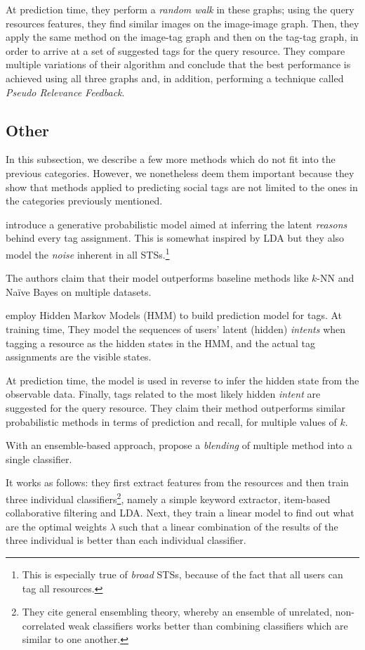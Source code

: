At prediction time, they perform a \textit{random walk} in these graphs; using the query resources features, they find similar images on the image-image graph. Then, they apply the same method on the image-tag graph and then on the tag-tag graph, in order to arrive at a set of suggested tags for the query resource. They compare multiple variations of their algorithm and conclude that the best performance is achieved using all three graphs and, in addition, performing a technique called \textit{Pseudo Relevance Feedback}.

\subsection{Other}

In this subsection, we describe a few more methods which do not fit into the previous categories. However, we nonetheless deem them important because they show that methods applied to predicting social tags are not limited to the ones in the categories previously mentioned. 

\cite{si_sun_2010} introduce a generative probabilistic model aimed at inferring the  latent \textit{reasons} behind every tag assignment. This is somewhat inspired by LDA but they also model the \textit{noise} inherent in all STSs.\footnote{This is especially true of \textit{broad} STSs, because of the fact that all users can tag all resources.}

The authors claim that their model outperforms baseline methods like $k$-NN and Naïve Bayes on multiple datasets.

\cite{trabelsi_etal_2012} employ Hidden Markov Models (HMM) \citep{rabiner_1989} to build prediction model for tags. At training time, They model the sequences of users' latent (hidden) \textit{intents} when tagging a resource as the hidden states in the HMM, and the actual tag assignments are the visible states.

At prediction time, the model is used in reverse to infer the hidden state from the observable data. Finally, tags related to the most likely hidden \textit{intent} are suggested for the query resource. They claim their method outperforms similar probabilistic methods in terms of prediction and recall, for multiple values of $k$.

With an ensemble-based approach, \cite{liu_etal_2013} propose a \textit{blending} of multiple method into a single classifier. 

It works as follows: they first extract features from the resources and then train three individual classifiers\footnote{They cite general ensembling theory, whereby an ensemble of unrelated, non-correlated weak classifiers works better than combining classifiers which are similar to one another.}, namely a simple keyword extractor, item-based collaborative filtering and LDA. Next, they train a linear model to find out what are the optimal weights $\lambda$ such that a linear combination of the results of the three individual is better than each individual classifier.

